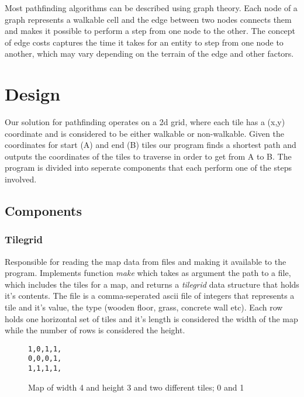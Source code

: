 \documentclass[12pt, a4paper]{article}
\begin{document}
Most pathfinding algorithms can be described using graph theory. Each node of a
graph represents a walkable cell and the edge between two nodes connects them
and makes it possible to perform a step from one node to the other. The concept
of edge costs captures the time it takes for an entity to step from one node to
another, which may vary depending on the terrain of the edge and other factors.






\section{Design}
Our solution for pathfinding operates on a 2d grid, where each tile has a (x,y) coordinate and is considered to be either walkable or non-walkable. Given the coordinates for start (A) and end (B) tiles our program finds a shortest path and outputs the coordinates of the tiles to traverse in order to get from A to B. The program is divided into seperate components that each perform one of the steps involved.

\subsection{Components}
\subsubsection{Tilegrid}

Responsible for reading the map data from files and making it available to the program. Implements function \textit{make} which takes as argument the path to a file, which includes the tiles for a map, and returns a \textit{tilegrid} data structure that holds it's contents. The file is a comma-seperated ascii file of integers that represents a tile and it's value, the type (wooden floor, grass, concrete wall etc). Each row holds one horizontal set of tiles and it's length is considered the width of the map while the number of rows is considered the height.
\begin{figure}[htbp]
\centering
\texttt{1,0,1,1,\\
0,0,0,1,\\
1,1,1,1,\\
}
\caption{Map of width 4 and height 3 and two different tiles; 0 and 1}
\end{figure}
\end{document}
